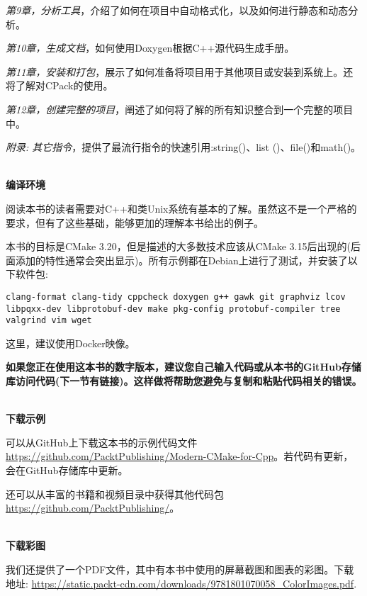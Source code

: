 \textit{第9章，分析工具}，介绍了如何在项目中自动格式化，以及如何进行静态和动态分析。

\textit{第10章，生成文档}，如何使用Doxygen根据C++源代码生成手册。

\textit{第11章，安装和打包}，展示了如何准备将项目用于其他项目或安装到系统上。还将了解对CPack的使用。

\textit{第12章，创建完整的项目}，阐述了如何将了解的所有知识整合到一个完整的项目中。

\textit{附录: 其它指令}，提供了最流行指令的快速引用:string()、list ()、file()和math()。

\hspace*{\fill} \\ %
\textbf{编译环境}

阅读本书的读者需要对C++和类Unix系统有基本的了解。虽然这不是一个严格的要求，但有了这些基础，能够更加的理解本书给出的例子。

本书的目标是CMake 3.20，但是描述的大多数技术应该从CMake 3.15后出现的(后面添加的特性通常会突出显示)。所有示例都在Debian上进行了测试，并安装了以下软件包:

\texttt{clang-format clang-tidy cppcheck doxygen g++ gawk git graphviz lcov libpqxx-dev libprotobuf-dev make pkg-config protobuf-compiler tree valgrind vim wget}

这里，建议使用Docker映像。

\textbf{如果您正在使用这本书的数字版本，建议您自己输入代码或从本书的GitHub存储库访问代码(下一节有链接)。这样做将帮助您避免与复制和粘贴代码相关的错误。}

\hspace*{\fill} \\ %
\textbf{下载示例}

可以从GitHub上下载这本书的示例代码文件 \url{https://github.com/PacktPublishing/Modern-CMake-for-Cpp}。若代码有更新，会在GitHub存储库中更新。

还可以从丰富的书籍和视频目录中获得其他代码包\url{https://github.com/PacktPublishing/}。


\hspace*{\fill} \\ %
\textbf{下载彩图}

我们还提供了一个PDF文件，其中有本书中使用的屏幕截图和图表的彩图。下载地址: \url{https://static.packt-cdn.com/downloads/9781801070058_ColorImages.pdf}.











